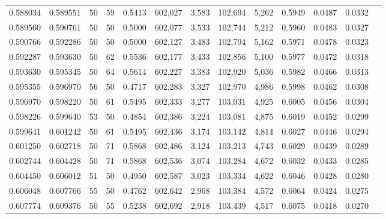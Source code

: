 \begin{tabular}{rrrrrrrrrrrrr}
0.588034 & 0.589551 &    50 &  59 &                                     0.5413 & 602,027 &   3,583 & 102,694 &   5,262 & 0.5949 & 0.0487 & 0.0332 \\
0.589560 & 0.590761 &    50 &  50 &                                     0.5000 & 602,077 &   3,533 & 102,744 &   5,212 & 0.5960 & 0.0483 & 0.0327 \\
0.590766 & 0.592286 &    50 &  50 &                                     0.5000 & 602,127 &   3,483 & 102,794 &   5,162 & 0.5971 & 0.0478 & 0.0323 \\
0.592287 & 0.593630 &    50 &  62 &                                     0.5536 & 602,177 &   3,433 & 102,856 &   5,100 & 0.5977 & 0.0472 & 0.0318 \\
0.593630 & 0.595345 &    50 &  64 &                                     0.5614 & 602,227 &   3,383 & 102,920 &   5,036 & 0.5982 & 0.0466 & 0.0313 \\
0.595355 & 0.596970 &    56 &  50 &                                     0.4717 & 602,283 &   3,327 & 102,970 &   4,986 & 0.5998 & 0.0462 & 0.0308 \\
0.596970 & 0.598220 &    50 &  61 &                                     0.5495 & 602,333 &   3,277 & 103,031 &   4,925 & 0.6005 & 0.0456 & 0.0304 \\
0.598226 & 0.599640 &    53 &  50 &                                     0.4854 & 602,386 &   3,224 & 103,081 &   4,875 & 0.6019 & 0.0452 & 0.0299 \\
0.599641 & 0.601242 &    50 &  61 &                                     0.5495 & 602,436 &   3,174 & 103,142 &   4,814 & 0.6027 & 0.0446 & 0.0294 \\
0.601250 & 0.602718 &    50 &  71 &                                     0.5868 & 602,486 &   3,124 & 103,213 &   4,743 & 0.6029 & 0.0439 & 0.0289 \\
0.602744 & 0.604428 &    50 &  71 &                                     0.5868 & 602,536 &   3,074 & 103,284 &   4,672 & 0.6032 & 0.0433 & 0.0285 \\
0.604450 & 0.606012 &    51 &  50 &                                     0.4950 & 602,587 &   3,023 & 103,334 &   4,622 & 0.6046 & 0.0428 & 0.0280 \\
0.606048 & 0.607766 &    55 &  50 &                                     0.4762 & 602,642 &   2,968 & 103,384 &   4,572 & 0.6064 & 0.0424 & 0.0275 \\
0.607774 & 0.609376 &    50 &  55 &                                     0.5238 & 602,692 &   2,918 & 103,439 &   4,517 & 0.6075 & 0.0418 & 0.0270 \\

\end{tabular}
